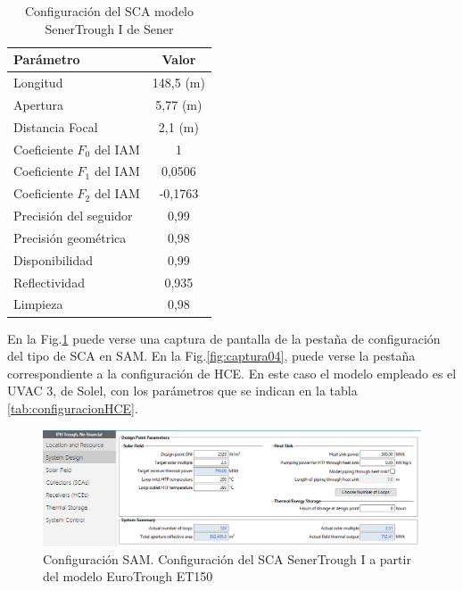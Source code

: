 \begin{table}[H]
\centering
\caption{Configuración del SCA modelo SenerTrough I de Sener}
\label{tab:configuracionSCA}
\begin{tabular}{lc}
Parámetro & Valor \\ \hline
Longitud &  148,5  (m) \\
Apertura &  5,77  (m) \\
Distancia Focal & 2,1 (m) \\
Coeficiente $F_{0}$ del  IAM  &  1 \\
Coeficiente $F_{1}$ del  IAM  &  0,0506 \\
Coeficiente $F_{2}$ del  IAM  &  -0,1763 \\
Precisión del seguidor &  0,99 \\
Precisión geométrica &  0,98 \\
Disponibilidad &  0,99 \\
Reflectividad &  0,935 \\
Limpieza &  0,98
\end{tabular}
\end{table}


En la Fig.\ref{fig:captura03} puede verse una captura de pantalla de la pestaña de configuración del tipo de SCA en SAM. En la Fig.\ref{fig:captura04}, puede verse la pestaña correspondiente a la configuración de HCE. En este caso el modelo empleado es el UVAC 3, de Solel, con los parámetros que se indican en la tabla \ref{tab:configuracionHCE}.


\begin{figure}[H]
\includegraphics[width=0.9\linewidth]{images/captura_sam_iph02.png}
\caption{Configuración SAM. Configuración del SCA SenerTrough I a partir del modelo EuroTrough ET150} 
\label{fig:captura03}
\end{figure}


